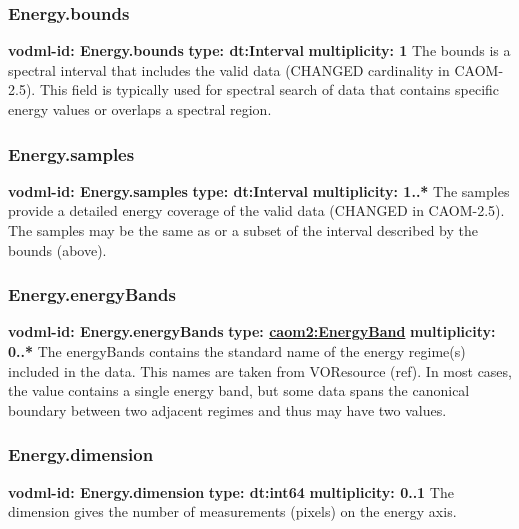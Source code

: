     \subsubsection{Energy.bounds}
      \textbf{vodml-id: Energy.bounds} \newline
      \textbf{type: dt:Interval} \newline
      \textbf{multiplicity: 1} \newline
      The bounds is a spectral interval that includes the valid data (CHANGED cardinality in CAOM-2.5). This field is typically used for spectral search of data that contains specific energy values or overlaps a spectral region.

    \subsubsection{Energy.samples}
      \textbf{vodml-id: Energy.samples} \newline
      \textbf{type: dt:Interval} \newline
      \textbf{multiplicity: 1..*} \newline
      The samples provide a detailed energy coverage of the valid data (CHANGED in CAOM-2.5). The samples may be the same as or a subset of the interval described by the bounds (above).

    \subsubsection{Energy.energyBands}
      \textbf{vodml-id: Energy.energyBands} \newline
      \textbf{type: \hyperref[sect:EnergyBand]{caom2:EnergyBand}} \newline
      \textbf{multiplicity: 0..*} \newline
      The energyBands contains the standard name of the energy regime(s) included in the data. This names are taken from VOResource (ref). In most cases, the value contains a single energy band, but some data spans the canonical boundary between two adjacent regimes and thus may have two values.

    \subsubsection{Energy.dimension}
      \textbf{vodml-id: Energy.dimension} \newline
      \textbf{type: dt:int64} \newline
      \textbf{multiplicity: 0..1} \newline
      The dimension gives the number of measurements (pixels) on the energy axis.

